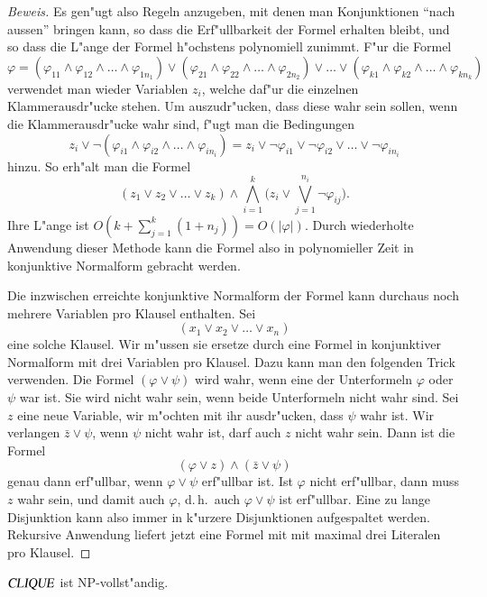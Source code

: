 \begin{proof}[Beweis]
Es gen"ugt also Regeln anzugeben, mit denen man Konjunktionen
``nach aussen'' bringen kann, so dass die Erf"ullbarkeit der
Formel erhalten bleibt, und so dass die L"ange der Formel 
h"ochstens polynomiell zunimmt. F"ur die Formel
\[
\varphi=
(
\varphi_{11}
\wedge
\varphi_{12}
\wedge
\dots
\wedge
\varphi_{1n_1}
)
\vee
(
\varphi_{21}
\wedge
\varphi_{22}
\wedge
\dots
\wedge
\varphi_{2n_2}
)
\vee\dots\vee
(
\varphi_{k1}
\wedge
\varphi_{k2}
\wedge
\dots
\wedge
\varphi_{kn_k}
)
\]
verwendet man wieder Variablen $z_i$, welche daf"ur die einzelnen
Klammerausdr"ucke stehen. Um auszudr"ucken, dass diese wahr sein
sollen, wenn die Klammerausdr"ucke wahr sind, f"ugt man
die Bedingungen
\[
z_i\vee \neg
(
\varphi_{i1}
\wedge
\varphi_{i2}
\wedge
\dots
\wedge
\varphi_{in_i}
)
=
z_i\vee
\neg\varphi_{i1}
\vee
\neg\varphi_{i2}
\vee
\dots
\vee
\neg\varphi_{in_i}
\]
hinzu. So erh"alt man die Formel
\[
(z_1\vee z_2\vee \dots\vee z_k)
\wedge
\bigwedge_{i=1}^k \biggl(z_i\vee \bigvee_{j=1}^{n_i} \neg\varphi_{ij}\biggr).
\]
Ihre L"ange ist $O(k+\sum_{j=1}^k(1+n_j))=O(|\varphi|)$.
Durch wiederholte Anwendung dieser Methode kann die
Formel also in polynomieller Zeit in konjunktive Normalform gebracht
werden.

Die inzwischen erreichte konjunktive Normalform der Formel kann durchaus
noch mehrere Variablen pro Klausel enthalten. Sei 
\[
(x_1\vee x_2\vee \dots\vee x_n)
\]
eine solche Klausel. Wir m"ussen sie ersetze durch eine
Formel in konjunktiver Normalform mit drei Variablen pro Klausel.
Dazu kann man den folgenden Trick verwenden.
Die Formel $(\varphi\vee\psi)$ wird wahr, wenn eine der Unterformeln
$\varphi$ oder $\psi$ war ist. Sie wird nicht wahr sein, wenn 
beide Unterformeln nicht wahr sind. Sei $z$ eine neue Variable,
wir m"ochten mit ihr ausdr"ucken, dass $\psi$ wahr ist. Wir
verlangen $\bar z \vee \psi$, wenn $\psi$ nicht wahr ist, darf auch $z$
nicht wahr sein. Dann ist die Formel
\[
(\varphi \vee z)\wedge(\bar z\vee \psi)
\]
genau dann erf"ullbar, wenn $\varphi\vee \psi$ erf"ullbar ist.
Ist $\varphi$ nicht erf"ullbar, dann muss $z$ wahr sein, und
damit auch $\varphi$, d.\,h.~auch $\varphi\vee\psi$ ist erf"ullbar.
Eine zu lange Disjunktion kann also immer in k"urzere Disjunktionen 
aufgespaltet werden. Rekursive Anwendung liefert jetzt eine Formel
mit mit maximal drei Literalen pro Klausel.
\end{proof}

\begin{satz}
$\text{\textsl{CLIQUE}}$ ist NP-vollst"andig.
\end{satz}

